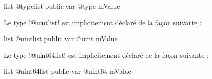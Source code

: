 \begin{galgasbox}
list @typelist {
  public var @type mValue
}
\end{galgasbox}






Le type \ggs!@uintlist! est implicitement déclaré de la façon suivante :

\begin{galgasbox}
list @uintlist {
  public var @uint mValue
}
\end{galgasbox}







Le type \ggs!@uint64list! est implicitement déclaré de la façon suivante :

\begin{galgasbox}
list @uint64list {
  public var @uint64 mValue
}
\end{galgasbox}

